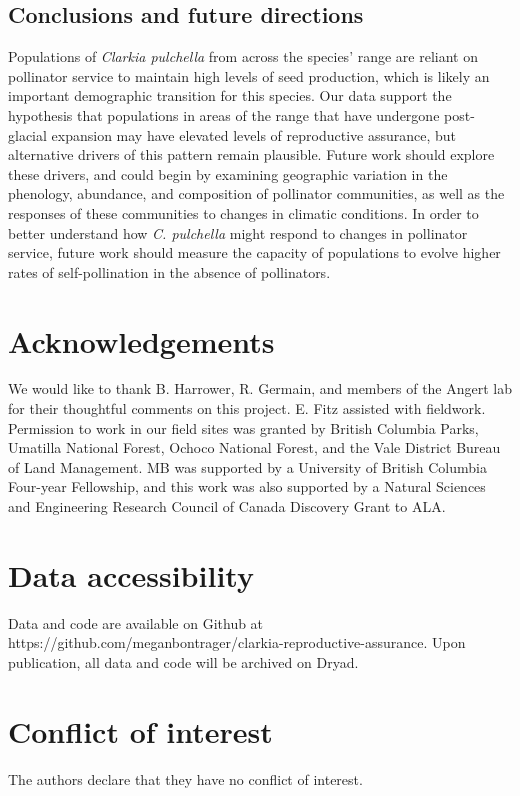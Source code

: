 \documentclass{article}
\begin{document}
\subsection*{Conclusions and future directions}
Populations of \textit{Clarkia pulchella} from across the species' range are reliant on pollinator service to maintain high levels of seed production, which is likely an important demographic transition for this species. Our data support the hypothesis that populations in areas of the range that have undergone post-glacial expansion may have elevated levels of reproductive assurance, but alternative drivers of this pattern remain plausible. Future work should explore these drivers, and could begin by examining geographic variation in the phenology, abundance, and composition of pollinator communities, as well as the responses of these communities to changes in climatic conditions. In order to better understand how \textit{C. pulchella} might respond to changes in pollinator service, future work should measure the capacity of populations to evolve higher rates of self-pollination in the absence of pollinators. 

\section*{Acknowledgements}
We would like to thank B. Harrower, R. Germain, and members of the Angert lab for their thoughtful comments on this project. E. Fitz assisted with fieldwork. Permission to work in our field sites was granted by British Columbia Parks, Umatilla National Forest, Ochoco National Forest, and the Vale District Bureau of Land Management. MB was supported by a University of British Columbia Four-year Fellowship, and this work was also supported by a Natural Sciences and Engineering Research Council of Canada Discovery Grant to ALA.

\section*{Data accessibility}
Data and code are available on Github at https://github.com/meganbontrager/clarkia-reproductive-assurance. Upon publication, all data and code will be archived on Dryad.

\section*{Conflict of interest} 
The authors declare that they have no conflict of interest.
\end{document}

